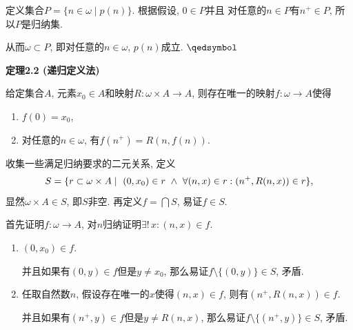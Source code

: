 \documentclass[UTF8]{ctexart}
\begin{document}

定义集合$P=\{n\in\omega\mid p(n)\}$. 根据假设, $0\in P$并且
对任意的$n\in P$有$n^+\in P$, 所以$P$是归纳集.

从而$\omega\subset P$, 即对任意的$n\in\omega$, $p(n)$成立. \hfill $\qedsymbol$

\vspace{10pt}

\hypertarget{sec:定理2.2}{}
\noindent\textbf{定理2.2 (递归定义法)}

给定集合$A$, 元素$x_0\in A$和映射$R:\omega\times A\to A$,
则存在唯一的映射$f:\omega\to A$使得
\begin{enumerate}
    \item $f(0)=x_0$,
    \item 对任意的$n\in\omega$, 有$f(n^+)=R(n,f(n))$.
\end{enumerate}




收集一些满足归纳要求的二元关系, 定义
\[
    S=\{r\subset\omega\times A\mid\,\,(0,x_0)\in r\,\,\land\,\,
    \forall(n,x)\in r:(n^+,R(n,x))\in r\},\\[3pt]
\]
显然$\omega\times A\in S$, 即$S$非空.
再定义$\displaystyle f=\bigcap S$, 易证$f\in S$.

\vspace{3pt}
首先证明$f:\omega\to A$, 对$n$归纳证明$\exists!\,x:(n,x)\in f$.

\begin{enumerate}
    \item $(0,x_0)\in f$.
    
    \hspace{2.17em}
    并且如果有$(0,y)\in f$但是$y\neq x_0$, 那么易证$f\setminus\{(0,y)\}\in S$, 矛盾.

    \item 任取自然数$n$, 假设存在唯一的$x$使得$(n,x)\in f$, 则有$(n^+,R(n,x))\in f$.

    \hspace{2.17em}
    并且如果有$(n^+,y)\in f$但是$y\neq R(n,x)$,
    那么易证$f\setminus\{(n^+,y)\}\in S$, 矛盾.
\end{enumerate}

\end{document}
